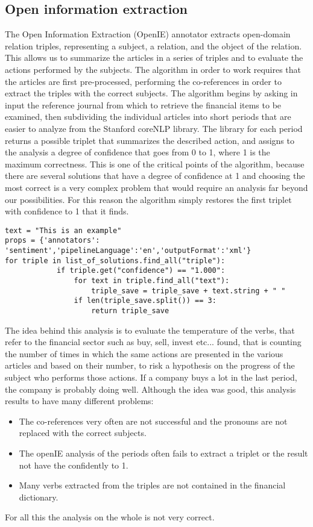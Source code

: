 \subsection{Open information extraction}
The Open Information Extraction (OpenIE) annotator extracts open-domain relation triples, representing a subject, a relation, and the object of the relation. This allows us to summarize the articles in a series of triples and to evaluate the actions performed by the subjects. 
The algorithm in order to work requires that the articles are first pre-processed, performing the co-references in order to extract the triples with the correct subjects. 
The algorithm begins by asking in input the reference journal from which to retrieve the financial items to be examined, then subdividing the individual articles into short periods that are easier to analyze from the Stanford coreNLP library. The library for each period returns a possible triplet that summarizes the described action, and assigns to the analysis a degree of confidence that goes from 0 to 1, where 1 is the maximum correctness. This is one of the critical points of the algorithm, because there are several solutions that have a degree of confidence at 1 and choosing the most correct is a very complex problem that would require an analysis far beyond our possibilities. For this reason the algorithm simply restores the first triplet with confidence to 1 that it finds.
\begin{verbatim}
text = "This is an example"
props = {'annotators': 'sentiment','pipelineLanguage':'en','outputFormat':'xml'}
for triple in list_of_solutions.find_all("triple"):
            if triple.get("confidence") == "1.000":
                for text in triple.find_all("text"):
                    triple_save = triple_save + text.string + " "
                if len(triple_save.split()) == 3:
                    return triple_save
\end{verbatim}

The idea behind this analysis is to evaluate the temperature of the verbs, that refer to the financial sector such as buy, sell, invest etc... found, that is counting the number of times in which the same actions are presented in the various articles and based on their number, to risk a hypothesis on the progress of the subject who performs those actions. If a company buys a lot in the last period, the company is probably doing well.
Although the idea was good, this analysis results to have many different problems:
\begin{itemize}
\item
The co-references very often are not successful and the pronouns are not replaced with the correct subjects.
\item
The openIE analysis of the periods often fails to extract a triplet or the result not have the confidently to 1.
\item
Many verbs extracted from the triples are not contained in the financial dictionary.
\end{itemize}
For all this the analysis on the whole is not very correct.
